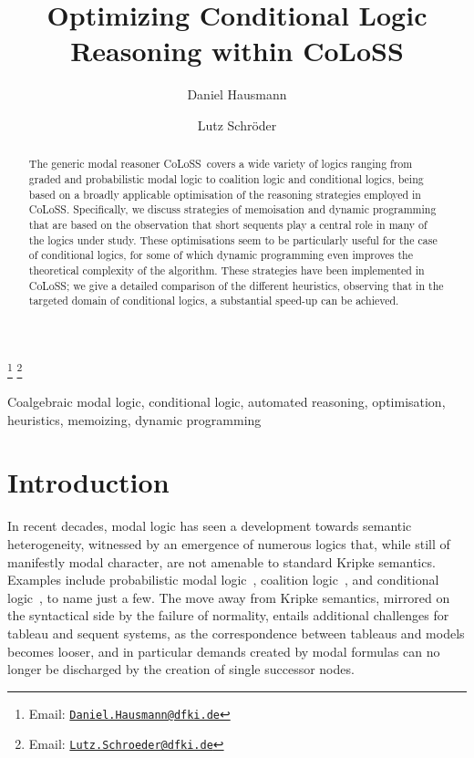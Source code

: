 \documentclass{entcs} \usepackage{entcsmacro}
\newcommand{\COLOSS}{{\textrm CoLoSS}}
\begin{document}
\begin{frontmatter}
  \title{Optimizing Conditional Logic Reasoning within \COLOSS}
  \author[DFKI]{Daniel Hausmann}
  \author[DFKI,UBremen]{Lutz Schr\"oder}
  \address[DFKI]{DFKI Bremen, SKS}
  \address[UBremen]{Department of Mathematics and Computer Science, Universit\"at Bremen, Germany}
  \thanks[myemail]{Email: \href{mailto:Daniel.Hausmann@dfki.de} {\texttt{\normalshape Daniel.Hausmann@dfki.de}}}
  \thanks[coemail]{Email: \href{mailto:Lutz.Schroeder@dfki.de} {\texttt{\normalshape Lutz.Schroeder@dfki.de}}}
\begin{abstract} 
  The generic modal reasoner \COLOSS~covers a wide variety of logics
  ranging from graded and probabilistic modal logic to coalition logic
  and conditional logics, being based on a broadly applicable
  optimisation of the reasoning strategies employed in
  \COLOSS. Specifically, we discuss strategies of memoisation and
  dynamic programming that are based on the observation that short
  sequents play a central role in many of the logics under
  study. These optimisations seem to be particularly useful for the
  case of conditional logics, for some of which dynamic programming
  even improves the theoretical complexity of the algorithm. These
  strategies have been implemented in \COLOSS; we give a detailed
  comparison of the different heuristics, observing that in the
  targeted domain of conditional logics, a substantial speed-up can be
  achieved.
\end{abstract}
\begin{keyword}
  Coalgebraic modal logic, conditional logic, automated reasoning,
  optimisation, heuristics, memoizing, dynamic programming
\end{keyword}
\end{frontmatter}
\section{Introduction}\label{intro}

In recent decades, modal logic has seen a development towards semantic
heterogeneity, witnessed by an emergence of numerous logics that,
while still of manifestly modal character, are not amenable to
standard Kripke semantics. Examples include probabilistic modal
logic~\cite{FaginHalpern94}, coalition logic~\cite{Pauly02}, and
conditional logic~\cite{Chellas80}, to name just a few. The move away
from Kripke semantics, mirrored on the syntactical side by the failure
of normality, entails additional challenges for tableau and sequent
systems, as the correspondence between tableaus and models becomes
looser, and in particular demands created by modal formulas can no
longer be discharged by the creation of single successor nodes. 
\end{document}
